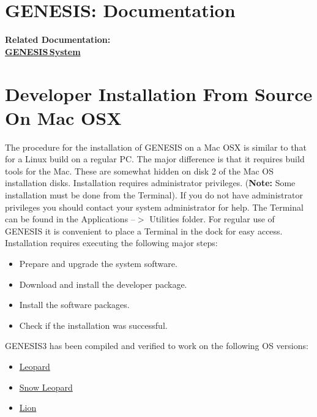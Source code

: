 \documentclass[12pt]{article}
\begin{document}
\section*{GENESIS: Documentation}

{\bf Related Documentation:} \\
\href{../genesis-system/genesis-system.tex}{\bf GENESIS\,System}


\section*{Developer Installation From Source On Mac OSX}

The procedure for the installation of GENESIS on a Mac OSX is similar to that for a Linux build on a regular PC. The major difference is that it requires build tools for the Mac. These are somewhat hidden on disk 2 of the Mac OS installation disks. Installation requires administrator privileges. ({\bf Note:} Some installation must be done from the Terminal). If you do not have administrator privileges you should contact your system administrator for help. The Terminal can be found in the Applications --$>$ Utilities folder. For regular use of GENESIS it is convenient to place a Terminal in the dock for easy access.
Installation requires executing the following major steps:
\begin{itemize}
   \item[] Prepare and upgrade the system software.
   \item[] Download and install the developer package.
   \item[] Install the software packages.
   \item[] Check if the installation was successful. 
\end{itemize}

GENESIS3 has been compiled and verified to work on the following OS versions:

\begin{itemize}
 \item[] \href{../installation-osx-leopard/installation-osx-leopard.tex}{Leopard}
 \item[] \href{../installation-osx-snow-leopard/installation-osx-snow-leopard.tex}{Snow Leopard}
 \item[] \href{../installation-osx-lion/installation-osx-lion.tex}{Lion}
\end{itemize}
\end{document}
